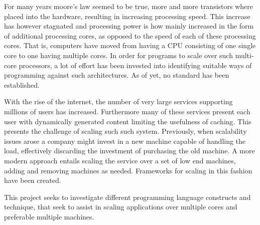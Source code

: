 \makeatletter {}\makeatother
{}
For many years moore's law\cite{moore1965cramming} seemed to be true, more and more transistors where placed into the hardware, resulting in increasing processing speed. This increase has however stagnated and processing power is how mainly increased in the form of additional processing cores, as opposed to the speed of each of these processing cores. That is, computers have moved from having a \ac{CPU} consisting of one single core to one having multiple cores. In order for programs to scale over such multi-core processors, a lot of effort has been invested into identifying suitable ways of programming against such architectures. As of yet, no standard has been established.

With the rise of the internet, the number of very large services supporting millions of users has increased. Furthermore many of these services present each user with dynamically generated content limiting the usefulness of caching. This presents the challenge of scaling such such system. Previously, when scalability issues arose a company might invest in a new machine capable of handling the load, effectively discarding the investment of purchasing the old machine\cite[p. 2]{haller2007actors}. A more modern approach entails scaling the service over a set of low end machines, adding and removing machines as needed. Frameworks for scaling in this fashion have been created\cite{haller2007actors}\cite{krohn2004building}.


This project seeks to investigate different programming language constructs and technique, that seek to assist in scaling applications over multiple cores and preferable multiple machines.



 
\worksheetend
